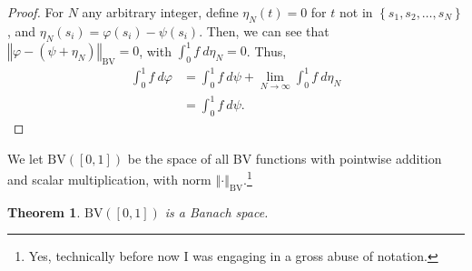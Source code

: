 \documentclass[10pt]{extarticle}
\newcommand{\norm}[1]{\left\Vert #1\right\Vert}
\newcommand{\set}[1]{\left\{#1\right\}}
\theoremstyle{plain}
\newtheorem*{theorem}{Theorem}
\theoremstyle{definition}
\theoremstyle{note}
\begin{document}
\begin{proof}
  For $N$ any arbitrary integer, define $\eta_{N}(t) = 0$ for $t$ not in $\set{s_1,s_2,\dots,s_N}$, and $\eta_{N}(s_i) = \varphi(s_i) - \psi(s_i)$. Then, we can see that $\norm{\varphi - \left(\psi + \eta_N\right)}_{\text{BV}} = 0$, with $\int_{0}^{1}f\:d\eta_N = 0$. Thus,
  \begin{align*}
    \int_{0}^{1}f\:d\varphi &= \int_{0}^{1}f\:d\psi + \lim_{N\rightarrow\infty}\int_{0}^{1}f\:d\eta_N\\
                            &= \int_{0}^{1} f\:d\psi.
  \end{align*}
\end{proof}
We let $\text{BV}\left([0,1]\right)$ be the space of all BV functions with pointwise addition and scalar multiplication, with norm $\norm{\cdot}_{\text{BV}}$.\footnote{Yes, technically before now I was engaging in a gross abuse of notation.}
\begin{theorem}
  $\text{BV}\left([0,1]\right)$ is a Banach space.
\end{theorem}
\end{document}
